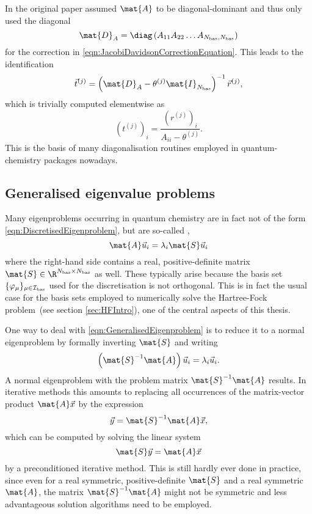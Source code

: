 In the original paper \citet{Davidson1975}
assumed $\mat{A}$ to be diagonal-dominant
and thus only used the diagonal
\[ \mat{D}_A = \diag\left( A_{11} A_{22} \ldots A_{\Nbas,\Nbas} \right) \]
for the correction in \eqref{eqn:JacobiDavidsonCorrectionEquation}.
This leads to the identification
\[
	\vec{t}^{(j)} = \left( \mat{D}_A - \theta^{(j)} \mat{I}_{\Nbas} \right)^{-1} \vec{r}^{(j)},
\]
which is trivially computed elementwise as
\[
	\left(t^{(j)}\right)_i = \frac{\left(r^{(j)}\right)_i}{A_{ii} - \theta^{(j)}}.
\]
This is the basis of many diagonalisation routines
employed in quantum-chemistry packages nowadays.

\subsection{Generalised eigenvalue problems}
\label{sec:GeneralisedEigenvalueProblem}
Many eigenproblems occurring in quantum chemistry are in fact
not of the form \eqref{eqn:DiscretisedEigenproblem},
but are so-called ,
\begin{equation}
	\mat{A} \vec{u}_i = \lambda_i \mat{S} \vec{u}_i
	\label{eqn:GeneralisedEigenproblem}
\end{equation}
where the right-hand side contains a
real, positive-definite matrix $\mat{S} \in \R^{\Nbas\times\Nbas}$ as well.
These typically arise because the
basis set $\{\varphi_\mu\}_{\mu \in \mathcal{I}_\text{bas}}$
used for the discretisation is not orthogonal.
This is in fact the usual case for the basis sets
employed to numerically
solve the Hartree-Fock problem~(see section \vref{sec:HFIntro}),
one of the central aspects of this thesis.

One way to deal with \eqref{eqn:GeneralisedEigenproblem} is to reduce
it to a normal eigenproblem by formally inverting $\mat{S}$ and writing
\[
	\left( \mat{S}^{-1} \mat{A} \right) \vec{u}_i = \lambda_i \vec{u}_i.
\]
A normal eigenproblem with the problem matrix $\mat{S}^{-1} \mat{A}$ results.
In iterative methods this amounts to replacing all occurrences
of the matrix-vector product $\mat{A}\vec{x}$ by the expression
\[ \vec{y} = \mat{S}^{-1} \mat{A} \vec{x}, \]
which can be computed by solving the linear system
\[ \mat{S} \vec{y} = \mat{A} \vec{x} \]
by a preconditioned iterative method.
This is still hardly ever done in practice,
since even for a real symmetric, positive-definite $\mat{S}$
and a real symmetric $\mat{A}$,
the matrix $\mat{S}^{-1} \mat{A}$ might not be symmetric
and less advantageous solution algorithms need to be employed.

